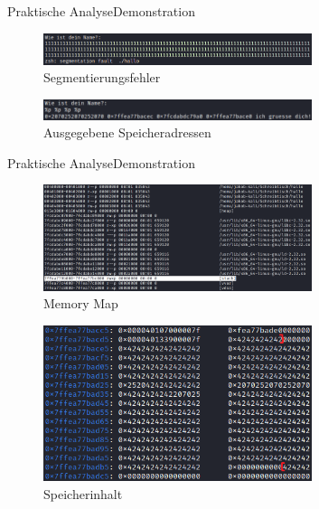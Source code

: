 \begin{frame}{Praktische Analyse}{Demonstration}
    \begin{figure}[h]
        \centering
        \includegraphics[width=0.7\textwidth,height=0.75\textheight,keepaspectratio]{images/segfault.png}
        \caption{Segmentierungsfehler}
    \end{figure}
    \begin{figure}[h]
        \centering
        \includegraphics[width=0.7\textwidth,height=0.75\textheight,keepaspectratio]{images/adressen.png}
        \caption{Ausgegebene Speicheradressen}
    \end{figure}
\end{frame}

\begin{frame}{Praktische Analyse}{Demonstration}
    \begin{figure}[h]
        \centering
        \includegraphics[width=0.7\textwidth,height=0.75\textheight,keepaspectratio]{images/map.png}
        \caption{Memory Map}
    \end{figure}
    \begin{figure}[h]
        \centering
        \includegraphics[width=0.7\textwidth,height=0.75\textheight,keepaspectratio]{images/buffer.png}
        \caption{Speicherinhalt}
    \end{figure}
\end{frame}

